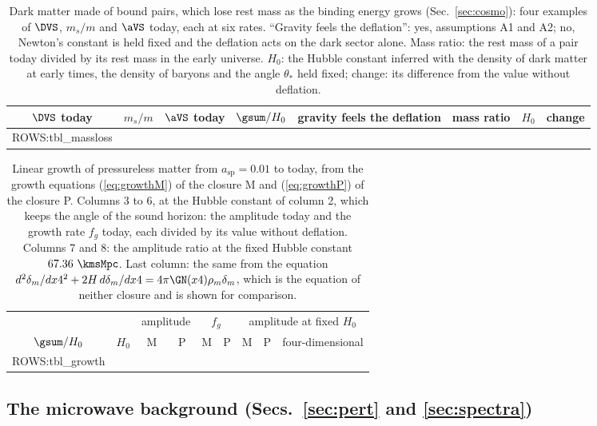 \begin{table}
\caption{\label{tab:xmassloss}Dark matter made of bound pairs, which lose rest mass as the binding
energy grows (Sec.~\ref{sec:cosmo}): four examples of $\DVS$, $m_s/m$ and $\aVS$ today, each at six
rates. ``Gravity feels the deflation'': yes, assumptions A1 and A2; no, Newton's constant is held
fixed and the deflation acts on the dark sector alone. Mass ratio: the rest mass of a pair today
divided by its rest mass in the early universe. $H_0$: the Hubble constant inferred with the density
of dark matter at early times, the density of baryons and the angle $\theta_*$ held fixed; change: its
difference from the value without deflation.}
\begin{ruledtabular}
\begin{tabular}{cccccccc}
$\DVS$ today & $m_s/m$ & $\aVS$ today & $\gsum/H_0$ & gravity feels the deflation & mass ratio & $H_0$ & change \\
\hline
{{ROWS:tbl_massloss}}
\end{tabular}
\end{ruledtabular}
\end{table}

\begin{table}
\caption{\label{tab:xgrowth}Linear growth of pressureless matter from $a_{\mathrm{sp}}=0.01$ to
today, from the growth equations (\ref{eq:growthM}) of the closure M and (\ref{eq:growthP}) of the
closure P. Columns 3 to 6, at the Hubble constant of column 2, which keeps the angle of the sound
horizon: the amplitude today and the growth rate $f_g$ today, each divided by its value without
deflation. Columns 7 and 8: the amplitude ratio at the fixed Hubble constant $67.36~\kmsMpc$. Last
column: the same from the equation
$d^{2}\delta_m/dx4^{2}+2H\,d\delta_m/dx4=4\pi\GN(x4)\rho_m\delta_m$, which is the equation of neither
closure and is shown for comparison.}
\begin{ruledtabular}
\begin{tabular}{ccccccccc}
 & & \multicolumn{2}{c}{amplitude} & \multicolumn{2}{c}{$f_g$} & \multicolumn{3}{c}{amplitude at fixed $H_0$} \\
$\gsum/H_0$ & $H_0$ & M & P & M & P & M & P & four-dimensional \\
\hline
{{ROWS:tbl_growth}}
\end{tabular}
\end{ruledtabular}
\end{table}

\subsection{The microwave background (Secs.~\ref{sec:pert} and \ref{sec:spectra})}

